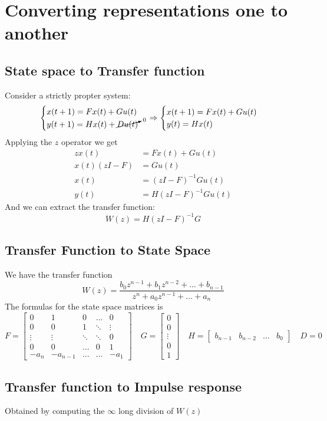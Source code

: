 \documentclass{article}
\begin{document}
\section{Converting representations one to another}
\subsection{State space to Transfer function}
Consider a strictly propter system:
\[
\begin{cases}
x(t+1)=Fx(t)+Gu(t)\\
y(t+1)=Hx(t)+\cancelto{0}{Du(t)}
\end{cases}
\Rightarrow
\begin{cases}
x(t+1)=Fx(t)+Gu(t)\\
y(t)=Hx(t)
\end{cases}
\]
Applying the $z$ operator we get
\begin{align*}
zx(t)&=Fx(t)+Gu(t)\\
x(t)(zI-F)&=Gu(t)\\
x(t)&=(zI-F)^{-1}Gu(t)\\
y(t)&=H(zI-F)^{-1}Gu(t)
\end{align*}
And we can extract the transfer function:
\[
W(z)=H(zI-F)^{-1}G
\]

\subsection{Transfer Function to State Space}
We have the transfer function
\[
W(z)=\frac{b_0z^{n-1}+b_1z^{n-2}+\dots+b_{n-1}}{z^n+a_0z^{n-1}+\dots+a_n}
\]
The formulas for the state space matrices is
\[
F=
\begin{bmatrix}
0&1&0&\dots&0\\
0&0&1&\ddots&\vdots\\
\vdots&\vdots&\ddots&\ddots&0\\
0&0&\dots&0&1\\
-a_n&-a_{n-1}&\dots&\dots&-a_1
\end{bmatrix}
\quad
G=\begin{bmatrix}
0\\0\\\vdots\\0\\1
\end{bmatrix}
\quad
H=\begin{bmatrix}
b_{n-1}&b_{n-2}&\dots&b_0
\end{bmatrix}
\quad
D=0
\]

\subsection{Transfer function to Impulse response}
Obtained by computing the $\infty$ long division of $W(z)$
\end{document}
